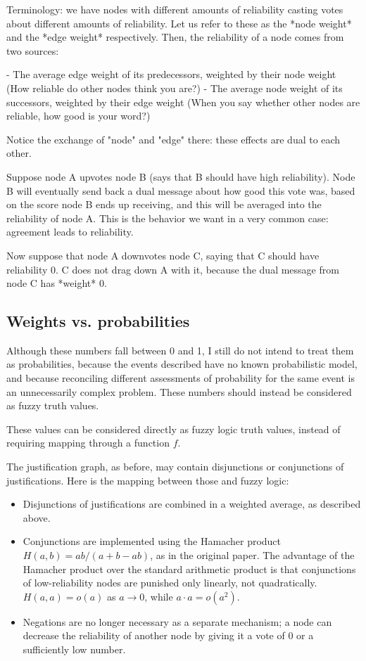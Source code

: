 Terminology: we have nodes with different amounts of reliability casting votes
about different amounts of reliability. Let us refer to these as the *node
weight* and the *edge weight* respectively. Then, the reliability of a node
comes from two sources:

- The average edge weight of its predecessors, weighted by their node weight
  (How reliable do other nodes think you are?)
- The average node weight of its successors, weighted by their edge weight
  (When you say whether other nodes are reliable, how good is your word?)

Notice the exchange of "node" and "edge" there: these effects are dual to each
other. 

Suppose node A upvotes node B (says that B should have high reliability). Node
B will eventually send back a dual message about how good this vote was, based
on the score node B ends up receiving, and this will be averaged into the
reliability of node A. This is the behavior we want in a very common case:
agreement leads to reliability.

Now suppose that node A downvotes node C, saying that C should have reliability
0. C does not drag down A with it, because the dual message from node C has
*weight* 0.

\subsection{Weights vs. probabilities}

Although these numbers fall between 0 and 1, I still do not intend to treat
them as probabilities, because the events described have no known probabilistic
model, and because reconciling different assessments of probability for the
same event is an unnecessarily complex problem. These numbers should instead be
considered as fuzzy truth values.

These values can be considered directly as fuzzy logic truth values, instead of
requiring mapping through a function $f$.

The justification graph, as before, may contain disjunctions or conjunctions of
justifications. Here is the mapping between those and fuzzy logic:

\begin{itemize}
\item Disjunctions of justifications are combined in a weighted average, as
described above.
\item Conjunctions are implemented using the Hamacher product $H(a, b) =
ab/(a+b-ab)$, as in the original paper. The advantage of the Hamacher product
over the standard arithmetic product is that conjunctions of low-reliability
nodes are punished only linearly, not quadratically. $H(a, a) = o(a)$ as $a
\rightarrow 0$, while $a \cdot a = o(a^2)$.
\item Negations are no longer necessary as a separate mechanism; a node can decrease the reliability of another node by giving it a vote of 0 or a sufficiently low number.
\end{itemize}

